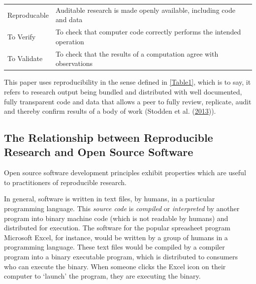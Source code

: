 \documentclass[11pt,preprint, authoryear]{elsarticle}
\numberwithin{equation}{section}
\numberwithin{figure}{section}
\numberwithin{table}{section}
\begin{document}
\begin{longtable}[]{@{}ll@{}}
\begin{minipage}[t]{0.18\columnwidth}
Reproducable\strut
\end{minipage} & \begin{minipage}[t]{0.61\columnwidth}\raggedright\strut
Auditable research is made openly available, including code and
data\strut
\end{minipage}\tabularnewline
\begin{minipage}[t]{0.18\columnwidth}\raggedright\strut
To Verify\strut
\end{minipage} & \begin{minipage}[t]{0.61\columnwidth}\raggedright\strut
To check that computer code correctly performs the intended
operation\strut
\end{minipage}\tabularnewline
\begin{minipage}[t]{0.18\columnwidth}\raggedright\strut
To Validate\strut
\end{minipage} & \begin{minipage}[t]{0.61\columnwidth}\raggedright\strut
To check that the results of a computation agree with observations\strut
\end{minipage}\tabularnewline
\bottomrule
\end{longtable}

This paper uses reproducibility in the sense defined in \ref{Table1},
which is to say, it refers to research output being bundled and
distributed with well documented, fully transparent code and data that
allows a peer to fully review, replicate, audit and thereby confirm
results of a body of work (Stodden et al.
(\protect\hyperlink{ref-Stodden2013}{2013})).

\subsection{The Relationship between Reproducible Research and Open
Source
Software}\label{the-relationship-between-reproducible-research-and-open-source-software}

Open source software development principles exhibit properties which are
useful to practitioners of reproducible research.

In general, software is written in text files, by humans, in a
particular programming language. This \emph{source code} is
\emph{compiled} or \emph{interpreted} by another program into binary
machine code (which is not readable by humans) and distributed for
execution. The software for the popular spreasheet program Microsoft
Excel, for instance, would be written by a group of humans in a
programming language. These text files would be compiled by a compiler
program into a binary executable program, which is distributed to
consumers who can execute the binary. When someone clicks the Excel icon
on their computer to `launch' the program, they are executing the
binary.
\end{document}
